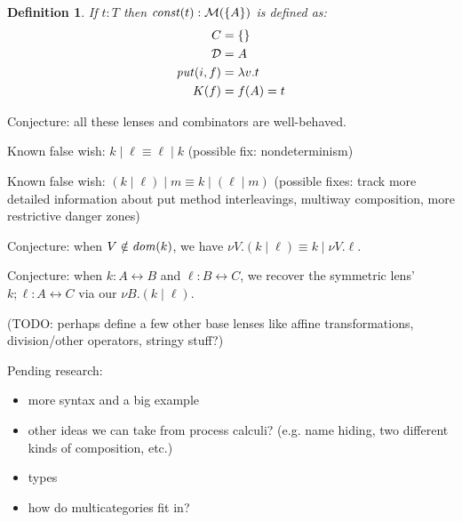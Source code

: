 \documentclass{article}
\newcommand{\lens}{\leftrightarrow}
\newtheorem{definition}{Definition}
\begin{document}
\newcommand{\const}{\mathit{const}}
\begin{definition}
    If $t : T$ then $\const(t) : \mlens{\{A\}}$ is defined as:
    \begin{align*}
        C &= \{\} \\
        \mathcal D &= A \\
        \mathit{put}(i,f) &= \lambda v. t \\
        K(f) &= f(A) = t
    \end{align*}
\end{definition}

Conjecture: all these lenses and combinators are well-behaved.

Known false wish: $k \mid \ell \equiv \ell \mid k$ (possible fix:
nondeterminism)

Known false wish: $(k \mid \ell) \mid m \equiv k \mid (\ell \mid m)$
(possible fixes: track more detailed information about put method
interleavings, multiway composition, more restrictive danger zones)

Conjecture: when $V \notin \mathit{dom}(k)$, we have $\nu V. (k \mid \ell) \equiv
k \mid \nu V. \ell$.

Conjecture: when $k : A \lens B$ and $\ell : B \lens C$, we recover the
symmetric lens' $k;\ell : A \lens C$ via our $\nu B.(k \mid \ell)$.

(TODO: perhaps define a few other base lenses like affine transformations,
division/other operators, stringy stuff?)

Pending research:
\begin{itemize}
    \item more syntax and a big example
    \item other ideas we can take from process calculi? (e.g. name hiding,
        two different kinds of composition, etc.)
    \item types
    \item how do multicategories fit in?
\end{itemize}
\end{document}
